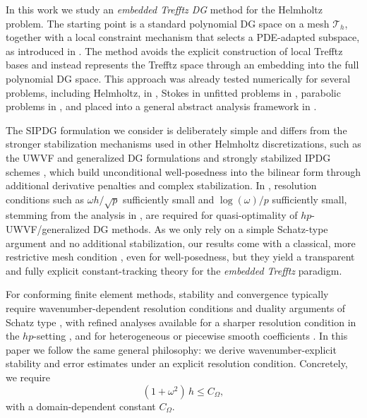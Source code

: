 \documentclass[11pt]{article}
\theoremstyle{definition}
\theoremstyle{plain}
\newcommand{\Th}{{\calT_h}}
\newcommand{\calT}{\mathcal{T}}
\begin{document}
In this work we study an \emph{embedded Trefftz DG} method for the Helmholtz problem.
The starting point is a standard polynomial DG space on a mesh $\Th$, together with a local constraint mechanism that selects a PDE-adapted subspace, as introduced in \cite{LS_IJMNE_2023,lozinski19}.
The method avoids the explicit construction of local Trefftz bases and instead represents the Trefftz space through an embedding into the full polynomial DG space.
This approach was already tested numerically for several problems, including Helmholtz, in \cite{LS_IJMNE_2023}, Stokes in 
\cite{LLS_NM_2024}
unfitted problems in \cite{HLSW_M2AN_2022,S23}, 
parabolic problems in \cite{GPS_JSC_2025,H24},
and placed into a general abstract analysis framework in \cite{LLSV_ARXIV_2024}.

The SIPDG formulation we consider is deliberately simple and differs from the stronger stabilization mechanisms used in other Helmholtz discretizations, such as the UWVF and generalized DG formulations \cite{MPS13,CD98,M11} and strongly stabilized IPDG schemes \cite{FW09,FW11}, which build unconditional well-posedness into the bilinear form through additional derivative penalties and complex stabilization.
In \cite{MPS13}, resolution conditions such as $\omega h/\sqrt{p}$ sufficiently small and $\log(\omega)/p$ sufficiently small, stemming from the analysis in \cite{MS10,MS11}, are required for quasi-optimality of $hp$-UWVF/generalized DG methods.
As we only rely on a simple Schatz-type argument and no additional stabilization, our results come with a classical, more restrictive mesh condition \cite{MM95}, even for well-posedness, but they yield a transparent and fully explicit constant-tracking theory for the \emph{embedded Trefftz} paradigm.

For conforming finite element methods, stability and convergence typically require wavenumber-dependent resolution conditions and duality arguments of Schatz type \cite{Schatz74,IB95,IB97,MM95}, with refined analyses available 
for a sharper resolution condition in the $hp$-setting \cite{MS10,MS11}, and
for heterogeneous or piecewise smooth coefficients \cite{BCM25}.
In this paper we follow the same general philosophy: we derive wavenumber-explicit stability and error estimates under an explicit resolution condition.
Concretely, we require
\begin{equation}\label{eq:intro_resolution}
(1+\omega^2)\,h \le C_\Omega,
\end{equation}
with a domain-dependent constant $C_\Omega$.
\end{document}
